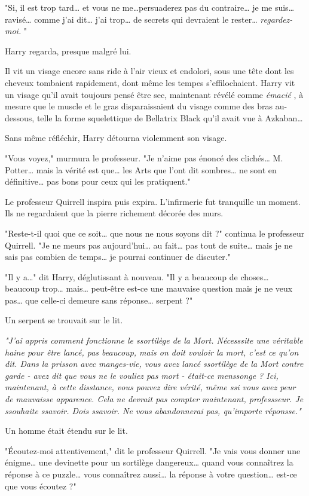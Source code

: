 "Si, il est trop tard… et vous ne me…persuaderez pas du contraire… je me suis… ravisé… comme j'ai dit… j'ai trop… de secrets qui devraient le rester… \emph{regardez-moi.} "

Harry regarda, presque malgré lui.

Il vit un visage encore sans ride à l'air vieux et endolori, sous une tête dont les cheveux tombaient rapidement, dont même les tempes s'effilochaient. Harry vit un visage qu'il avait toujours pensé être sec, maintenant révélé comme \emph{émacié} , à mesure que le muscle et le gras disparaissaient du visage comme des bras au-dessous, telle la forme squelettique de Bellatrix Black qu'il avait vue à Azkaban…

Sans même réfléchir, Harry détourna violemment son visage.

"Vous voyez," murmura le professeur. "Je n'aime pas énoncé des clichés… M. Potter… mais la vérité est que… les Arts que l'ont dit sombres… ne sont en définitive… pas bons pour ceux qui les pratiquent."

Le professeur Quirrell inspira puis expira. L'infirmerie fut tranquille un moment. Ils ne regardaient que la pierre richement décorée des murs.

"Reste-t-il quoi que ce soit… que nous ne nous soyons dit ?" continua le professeur Quirrell. "Je ne meurs pas aujourd'hui… au fait… pas tout de suite… mais je ne sais pas combien de temps… je pourrai continuer de discuter."

"Il y a…" dit Harry, déglutissant à nouveau. "Il y a beaucoup de choses… beaucoup trop… mais… peut-être est-ce une mauvaise question mais je ne veux pas… que celle-ci demeure sans réponse… serpent ?"

Un serpent se trouvait sur le lit.

\emph{"J'ai appris comment fonctionne le ssortilège de la Mort. Nécesssite une véritable haine pour être lancé, pas beaucoup, mais on doit vouloir la mort, c'est ce qu'on dit. Dans la prisson avec manges-vie, vous avez lancé ssortilège de la Mort contre garde - avez dit que vous ne le vouliez pas mort - était-ce menssonge ? Ici, maintenant, à cette disstance, vous pouvez dire vérité, même ssi vous avez peur de mauvaisse apparence. Cela ne devrait pas compter maintenant, professseur. Je ssouhaite ssavoir. Dois ssavoir. Ne vous abandonnerai pas, qu'importe réponsse."} 

Un homme était étendu sur le lit.

"Écoutez-moi attentivement," dit le professeur Quirrell. "Je vais vous donner une énigme… une devinette pour un sortilège dangereux… quand vous connaîtrez la réponse à ce puzzle… vous connaîtrez aussi… la réponse à votre question… est-ce que vous écoutez ?"

